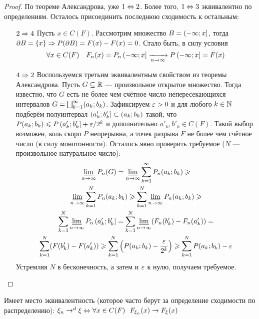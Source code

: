 \begin{proof}
	По теореме Александрова, уже $1 \Leftrightarrow 2$. Более того, $1 \Leftrightarrow 3$ эквивалентно по определениям. Осталось присоединить последнюю сходимость к остальным:
	\begin{itemize}
		\item[$2 \Rightarrow 4$] Пусть $x \in C(F)$. Рассмотрим множество $B = \left(-\infty; x\right]$, тогда $\partial B = \{x\} \Rightarrow P(\partial B) = F(x) - F(x) = 0$. Стало быть, в силу условия
		\[
			\forall x \in C(F) \quad F_n(x) = P_n\left(-\infty; x\right] \xrightarrow[n \to \infty]{} P\left(-\infty; x\right] = F(x)
		\]
		
		\item[$4 \Rightarrow 2$] Воспользуемся третьим эквивалентным свойством из теоремы Александрова. Пусть $G \subseteq \mathbb{R}$ --- произвольное открытое множество. Тогда известно, что $G$ есть не более чем счётное число непересекающихся интервалов $G = \bigsqcup_{k = 1}^\infty (a_k; b_k)$. Зафиксируем $\varepsilon > 0$ и для любого $k \in \mathbb{N}$ подберём полуинтервал $\left(a'_k; b'_k\right] \subset (a_k; b_k)$ такой, что $P(a_k; b_k) \leqslant P\left(a'_k; b'_k\right] + \varepsilon / 2^k$ и дополнительно $a'_k, b'_k \in C(F)$. Такой выбор возможен, коль скоро $P$ непрерывна, а точек разрыва $F$ не более чем счётное число (в силу монотонности). Осталось явно проверить требуемое ($N$ --- произвольное натуральное число):
		\begin{multline*}
			\varliminf_{n \to \infty} P_n(G) = \varliminf_{n \to \infty} \sum_{k = 1}^\infty P_n(a_k; b_k) \geqslant
			\\
			\varliminf_{n \to \infty} \sum_{k = 1}^N P_n(a_k; b_k) \geqslant \sum_{k = 1}^N \varliminf_{n \to \infty} P_n(a_k; b_k) \geqslant
			\\
			\sum_{k = 1}^N \varliminf_{n \to \infty} P_n\left(a'_k; b'_k\right] = \sum_{k = 1}^N \varliminf_{n \to \infty} (F_n(b'_k) - F_n(a'_k)) =
			\\
			\sum_{k = 1}^N (F(b'_k) - F(a'_k)) \geqslant \sum_{k = 1}^N \left(P(a_k; b_k) - \frac{\varepsilon}{2^k}\right) \geqslant \sum_{k = 1}^N P(a_k; b_k) - \varepsilon
		\end{multline*}
		Устремляя $N$ в бесконечность, а затем и $\varepsilon$ к нулю, получаем требуемое.
	\end{itemize}
\end{proof}

\begin{corollary}
	Имеет место эквивалентность (которое часто берут за определение сходимости по распределению): $\xi_n \to^d \xi \Leftrightarrow \forall x \in C(F)\ \ F_{\xi_n}(x) \to F_\xi(x)$
\end{corollary}

